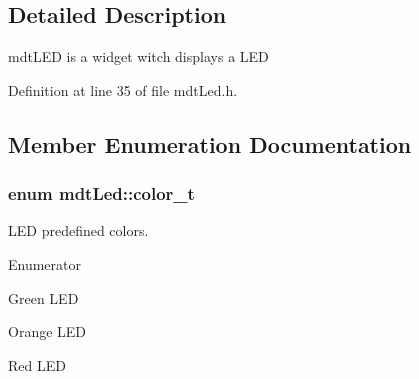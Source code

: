\subsection{Detailed Description}
mdt\-L\-E\-D is a widget witch displays a L\-E\-D 



Definition at line 35 of file mdt\-Led.\-h.



\subsection{Member Enumeration Documentation}
\hypertarget{classmdt_led_a2d57d9ef04d2105d2fad93b57fc7cfef}{
\subsubsection[{color\-\_\-t}]{\setlength{\rightskip}{0pt plus 5cm}enum {\bf mdt\-Led\-::color\-\_\-t}}}\label{classmdt_led_a2d57d9ef04d2105d2fad93b57fc7cfef}


L\-E\-D predefined colors. 

\begin{Desc}
\item[Enumerator]\par
\begin{description}
\item[{\em 
\hypertarget{classmdt_led_a2d57d9ef04d2105d2fad93b57fc7cfefa45b61a84d67fbd6379dee70b59193415}{Green}\label{classmdt_led_a2d57d9ef04d2105d2fad93b57fc7cfefa45b61a84d67fbd6379dee70b59193415}
}]Green L\-E\-D \item[{\em 
\hypertarget{classmdt_led_a2d57d9ef04d2105d2fad93b57fc7cfefa5dc598374ab643ab42ea786bc7fe4a04}{Orange}\label{classmdt_led_a2d57d9ef04d2105d2fad93b57fc7cfefa5dc598374ab643ab42ea786bc7fe4a04}
}]Orange L\-E\-D \item[{\em 
\hypertarget{classmdt_led_a2d57d9ef04d2105d2fad93b57fc7cfefab889f9da8e6cf657379cb521c3d11406}{Red}\label{classmdt_led_a2d57d9ef04d2105d2fad93b57fc7cfefab889f9da8e6cf657379cb521c3d11406}
}]Red L\-E\-D \end{description}
\end{Desc}


